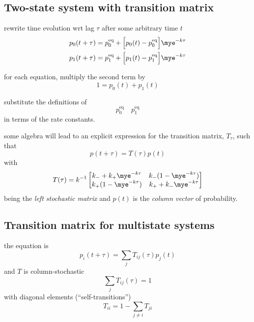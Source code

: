 \documentclass[twocolumn]{notes}
\begin{document}
\subsection{Two-state system with transition matrix}
\begin{itemizec}
    \item rewrite time evolution wrt lag $\tau$ after some arbitrary time $t$
    \begin{align*}
        p_0(t+\tau)
        &= p_0^\mathrm{eq} + \Big[p_0(t) - p_0^\mathrm{eq}\Big]\mye^{-k\tau} \\
        p_1(t+\tau)
        &= p_1^\mathrm{eq} + \Big[p_1(t) - p_1^\mathrm{eq}\Big]\mye^{-k\tau}
    \end{align*}
    \item for each equation, multiply the second term by
    \[
        1 = p_0(t) + p_1(t)
    \]
    \item substitute the definitions of
    \[
        p_0^\mathrm{eq} \quad p_1^\mathrm{eq}
    \]
    in terms of the rate constants.
    \item some algebra will lead to an explicit expression for the transition matrix, $T_\tau$, such that
    \[
        p(t+\tau) =  T(\tau) p(t)
    \]
    with
    \[
        T(\tau) = k^{-1}\begin{bmatrix}
            k_- + k_+\mye^{-k\tau} & k_-(1-\mye^{-k\tau})  \\
            k_+(1-\mye^{-k\tau}) & k_+ + k_-\mye^{-k\tau}
        \end{bmatrix}
    \]
    being the \emph{left stochastic matrix} and $p(t)$ is the \emph{column vector} of probability.
\end{itemizec}

\subsection{Transition matrix for multistate systems}
\begin{itemizec}
    \item the equation is
    \[
        p_i(t+\tau) =  \sum_j T_{ij}(\tau) p_j(t)
    \]
    and $T$ is column-stochastic
    \[
        \sum_j T_{ij}(\tau) = 1
    \]
    with diagonal elements (``self-transitions'')
    \[
        T_{ii} = 1 - \sum_{j\ne i}T_{ji}
    \]
\end{itemizec}
\end{document}
